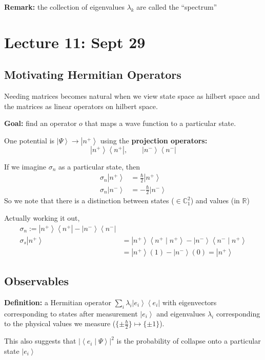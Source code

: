 \documentclass[12pt]{article}
\newcommand{\R}{\mathbb{R}}
\newcommand{\brak}[1]{\left\langle #1 \right\rangle}
\newcommand{\C}{\mathbb{C}}
\newcommand{\bra}[1]{\left\langle #1 \right\vert }
\newcommand{\ket}[1]{\left\vert #1 \right\rangle}
\begin{document}
\textbf{Remark:} the collection of eigenvalues $\lambda_k$ are called the ``spectrum''

\section*{Lecture 11: Sept 29}
\subsection*{Motivating Hermitian Operators}
Needing matrices becomes natural when we view state space as hilbert space and the matrices as linear operators on hilbert space. 

\textbf{Goal:} find an operator $o$ that maps a wave function to a particular state. 

One potential is $\ket \Psi \to \ket{n^+}$ using the \textbf{projection operators:}
\[\ket{n^+}\bra{n^+}, \qquad \ket{n^-}\bra{n^-}\]

If we imagine $\sigma_n$ as a particular state, then 
\begin{align*}
    \sigma_n\ket{n^+} &= \frac{\hbar}{2}\ket{n^+}\\
    \sigma_n \ket{n^-} &= -\frac{\hbar}{2}\ket{n^-}
\end{align*}
So we note that there is a distinction between states ($\in \C_1^2$) and values (in $\R$)

Actually working it out, 
\begin{align*}
    \sigma_n := \ket{n^+}\bra{n^+} - \ket{n^-}\bra{n^-}\\
    \sigma_s \ket{n^+} &= \ket{n^+} \brak{n^+ \; | \; n^+} - \ket{n^-}\brak{n^- \; | \; n^+}\\
    &= \ket{n^+} (1) - \ket{n^-}(0) = \ket{n^+}
\end{align*}

\subsection*{Observables}
\textbf{Definition:} a Hermitian operator $\sum_i \lambda_i \ket{e_i} \bra{e_i}$ with eigenvectors corresponding to states after measurement $\ket{e_i}$ and eigenvalues $\lambda_i$ corresponding to the physical values we measure ($\{\pm \frac{\hbar}{2}\} \mapsto \{\pm 1\}$). 

This also suggests that $\big\vert \brak{e_i \; | \; \Psi}
\big\vert^2$ is the probability of collapse onto a particular state $\ket{e_i}$ 
\end{document}
